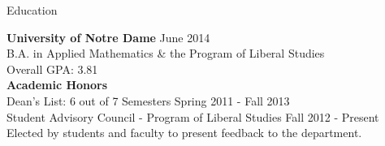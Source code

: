 \documentclass{resume} %
\begin{document}

\begin{rSection}{Education}

{\bf University of Notre Dame} \hfill {June 2014} \\ 
B.A. in Applied Mathematics \& the Program of Liberal Studies \\
Overall GPA: 3.81 \\
\textbf{Academic Honors} \\
Dean's List: 6 out of 7 Semesters \hfill Spring 2011 - Fall 2013\\
Student Advisory Council - Program of Liberal Studies \hfill Fall 2012 - Present\\
Elected by students and faculty to present feedback to the department.
\end{rSection}

\end{document}
